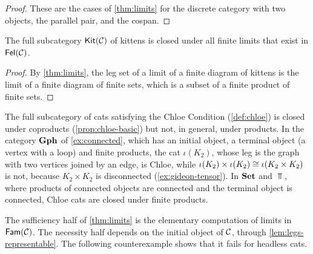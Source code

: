 \begin{proof}
These are the cases of \cref{thm:limits} for the discrete category with two
objects, the parallel pair, and the cospan.
\end{proof}

\begin{corollary}\label{cor:kit-limits}
The full subcategory $\mathsf{Kit}(\mathcal{C})$ of kittens is closed under all finite limits
that exist in $\mathsf{Fel}(\mathcal{C})$.
\end{corollary}

\begin{proof}
By \cref{thm:limits}, the leg set of a limit of a finite diagram of kittens is
the limit of a finite diagram of finite sets, which is a subset of a finite
product of finite sets.
\end{proof}

\begin{remark}\label{rem:chloe-limits}
The full subcategory of cats satisfying the Chloe Condition (\cref{def:chloe})
is closed under coproducts (\cref{prop:chloe-basic}) but not, in general, under
products. In the category $\mathbf{Gph}$ of \cref{ex:connected}, which has an initial
object, a terminal object (a vertex with a loop) and finite products, the cat
$\iota(K_2)$, whose leg is the graph with two vertices joined by an edge, is
Chloe, while $\iota(K_2)\times\iota(K_2)\cong\iota(K_2\times K_2)$ is not, because
$K_2\times K_2$ is disconnected (\cref{ex:gideon-tensor}). In $\mathbf{Set}$ and $\Top$,
where products of connected objects are connected and the terminal object is
connected, Chloe cats are closed under finite products.
\end{remark}


\begin{remark}\label{rem:limits-honest}
The sufficiency half of \cref{thm:limits} is the elementary computation of
limits in $\mathsf{Fam}(\mathcal{C})$. The necessity half depends on the initial object of
$\mathcal{C}$, through \cref{lem:legs-representable}. The following counterexample
shows that it fails for headless cats.
\end{remark}

